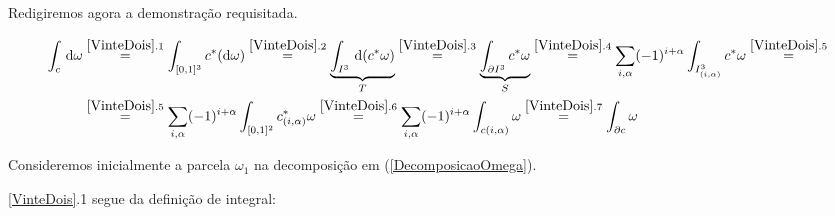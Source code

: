 \documentclass[12pt,a4paper]{article}
\begin{document}
		\begin{flushright}
		\end{flushright}
		
		Redigiremos agora a demonstra\c{c}\~ao requisitada.
		
		\begin{align}
			\int_c \,\mathrm{d}\omega &\stackrel{\ref{VinteDois}.1}{=} \int_{[0, 1]^3} c^*(\mathrm{d}\omega) \stackrel{\ref{VinteDois}.2}{=} \underbrace{\int_{I^3} \,\mathrm{d}(c^*\omega)}_\text{$T$} \stackrel{\ref{VinteDois}.3}{=} \underbrace{\int_{\partial I^3} c^*\omega}_\text{$S$} \stackrel{\ref{VinteDois}.4}{=} \sum_{i,\alpha} (-1)^{i + \alpha} \int_{I_{(i, \alpha)}^3} c^*\omega \stackrel{\ref{VinteDois}.5}{=} \label{VinteDois} \\
				&\stackrel{\ref{VinteDois}.5}{=} \sum_{i,\alpha} (-1)^{i + \alpha} \int_{[0,1]^2} c_{(i, \alpha)}^* \omega \stackrel{\ref{VinteDois}.6}{=} \sum_{i,\alpha} (-1)^{i + \alpha} \int_{c(i,\alpha)} \omega \stackrel{\ref{VinteDois}.7}{=} \int_{\partial c} \omega
		\end{align}
		
		Consideremos inicialmente a parcela $\omega_1$ na decomposi\c{c}\~ao em (\ref{DecomposicaoOmega}).
		
		\ref{VinteDois}.1 segue da defini\c{c}\~ao de integral:
		
\end{document}

